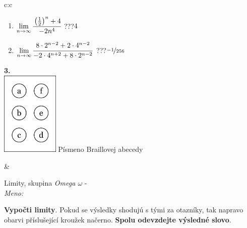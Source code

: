 \documentclass[10pt]{report}
\begin{document}
\begin{tabular}{c:c}
\begin{minipage}[c][104.5mm][t]{0.5\linewidth}
\begin{center}
\begin{minipage}{0.79\linewidth}
\begin{center}
\begin{varwidth}{\linewidth}
\begin{enumerate}
\item $\lim\limits_{n\to\infty}\cfrac{\left(\frac{1}{2}\right)^n +4}{-2n^{4}}$\quad \dotfill\; ???\;\dotfill \quad $4$
\item $\lim\limits_{n\to\infty}\cfrac{8\cdot 2^{n-2}+2\cdot 4^{n-2}}{-2\cdot 4^{n+2}+8\cdot 2^{n-2}}$\quad \dotfill\; ???\;\dotfill \quad $\nicefrac{-1}{256}$
\end{enumerate}
\end{varwidth}
\end{center}
\end{minipage}
\begin{minipage}{0.20\linewidth}
\begin{center}
{\Huge\bfseries 3.} \\[2mm]
\includegraphics[height=40mm]{../images/braille.png}
{\small Písmeno Braillovej abecedy}
\end{center}
\end{minipage}
\end{center}
\end{minipage}
&
\begin{minipage}[c][104.5mm][t]{0.5\linewidth}
\begin{center}
\vspace{7mm}
{\huge Limity, skupina \textit{Omega $\omega$} -}\\[5mm]
\textit{Meno:}\phantom{xxxxxxxxxxxxxxxxxxxxxxxxxxxxxxxxxxxxxxxxxxxxxxxxxxxxxxxxxxxxxxxxx}\\[5mm]
\begin{minipage}{0.95\linewidth}
\begin{center}
\textbf{Vypočti limity}. Pokud se výsledky shodujú s tými za otazníky, tak napravo\\obarvi příslušející kroužek načerno. \textbf{Spolu odevzdejte výsledné slovo}.
\end{center}
\end{minipage}
\\[1mm]
\begin{minipage}{0.79\linewidth}
\begin{center}
\begin{varwidth}{\linewidth}

\end{varwidth}
\end{center}
\end{minipage}
\end{center}
\end{minipage}
\end{tabular}
\end{document}
